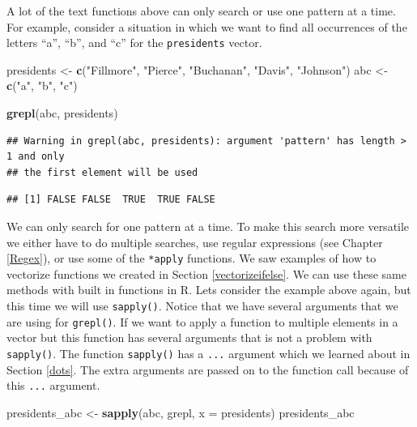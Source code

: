 \documentclass[
]{book}
\newenvironment{Shaded}{\begin{snugshade}}{\end{snugshade}}
\newcommand{\DataTypeTok}[1]{\textcolor[rgb]{0.13,0.29,0.53}{#1}}
\newcommand{\KeywordTok}[1]{\textcolor[rgb]{0.13,0.29,0.53}{\textbf{#1}}}
\newcommand{\NormalTok}[1]{#1}
\newcommand{\StringTok}[1]{\textcolor[rgb]{0.31,0.60,0.02}{#1}}
\begin{document}
A lot of the text functions above can only search or use one pattern at a time. For example, consider a situation in which we want to find all occurrences of the letters ``a'', ``b'', and ``c'' for the \texttt{presidents} vector.

\begin{Shaded}
\begin{Highlighting}[]
\NormalTok{presidents <-}\StringTok{ }\KeywordTok{c}\NormalTok{(}\StringTok{"Fillmore"}\NormalTok{, }\StringTok{"Pierce"}\NormalTok{, }\StringTok{"Buchanan"}\NormalTok{, }\StringTok{"Davis"}\NormalTok{, }\StringTok{"Johnson"}\NormalTok{)}
\NormalTok{abc <-}\StringTok{ }\KeywordTok{c}\NormalTok{(}\StringTok{"a"}\NormalTok{, }\StringTok{"b"}\NormalTok{, }\StringTok{"c"}\NormalTok{)}


\KeywordTok{grepl}\NormalTok{(abc, presidents)}
\end{Highlighting}
\end{Shaded}

\begin{verbatim}
## Warning in grepl(abc, presidents): argument 'pattern' has length > 1 and only
## the first element will be used
\end{verbatim}

\begin{verbatim}
## [1] FALSE FALSE  TRUE  TRUE FALSE
\end{verbatim}

We can only search for one pattern at a time. To make this search more versatile we either have to do multiple searches, use regular expressions (see Chapter \ref{Regex}), or use some of the \texttt{*apply} functions. We saw examples of how to vectorize functions we created in Section \ref{vectorizeifelse}. We can use these same methods with built in functions in R. Lets consider the example above again, but this time we will use \texttt{sapply()}. Notice that we have several arguments that we are using for \texttt{grepl()}. If we want to apply a function to multiple elements in a vector but this function has several arguments that is not a problem with \texttt{sapply()}. The function \texttt{sapply()} has a \texttt{...} argument which we learned about in Section \ref{dots}. The extra arguments are passed on to the function call because of this \texttt{...} argument.

\begin{Shaded}
\begin{Highlighting}[]
\NormalTok{presidents_abc <-}\StringTok{ }\KeywordTok{sapply}\NormalTok{(abc, grepl, }\DataTypeTok{x =}\NormalTok{ presidents)}
\NormalTok{presidents_abc}
\end{Highlighting}
\end{Shaded}
\end{document}
